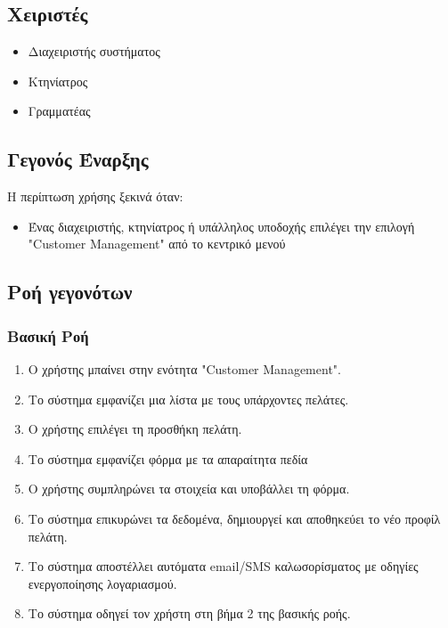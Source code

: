 \documentclass[12pt,a4paper,twoside]{book}
\begin{document}
\subsection{Χειριστές}
\begin{itemize}
  \item Διαχειριστής συστήματος
  \item Κτηνίατρος
  \item Γραμματέας
\end{itemize}

\subsection{Γεγονός Έναρξης}
Η περίπτωση χρήσης ξεκινά όταν:
\begin{itemize}
  \item Ένας διαχειριστής, κτηνίατρος ή υπάλληλος υποδοχής επιλέγει την επιλογή "Customer Management" από το κεντρικό μενού
\end{itemize}

\subsection{Ροή γεγονότων}

\subsubsection{Βασική Ροή}
\begin{enumerate}
  \item Ο χρήστης μπαίνει στην ενότητα "Customer Management".
  \item Το σύστημα εμφανίζει μια λίστα με τους υπάρχοντες πελάτες.
  \item Ο χρήστης επιλέγει τη προσθήκη πελάτη.
  \item Το σύστημα εμφανίζει φόρμα με τα απαραίτητα πεδία %
  \item Ο χρήστης συμπληρώνει τα στοιχεία και υποβάλλει τη φόρμα.
  \item Το σύστημα επικυρώνει τα δεδομένα, δημιουργεί και αποθηκεύει το νέο προφίλ πελάτη.
  \item Το σύστημα αποστέλλει αυτόματα email/SMS καλωσορίσματος με οδηγίες ενεργοποίησης λογαριασμού.
  \item Το σύστημα οδηγεί τον χρήστη στη βήμα 2 της βασικής ροής.
\end{enumerate}
\end{document}
